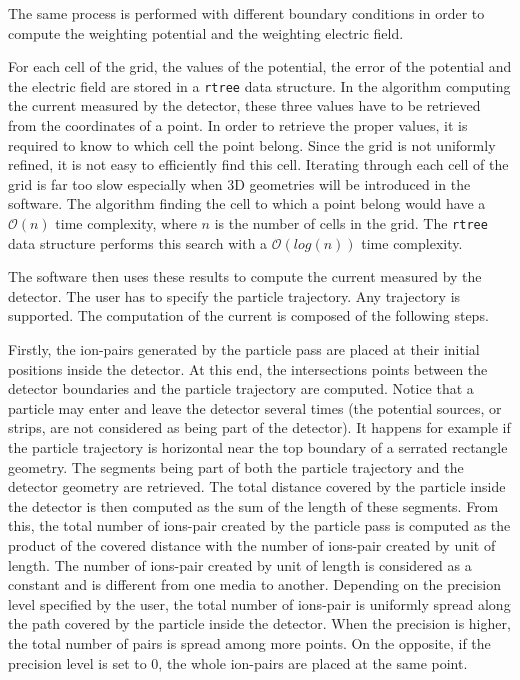 \documentclass[11pt]{article}
\begin{document}
The same process is performed with different boundary conditions in order
to compute the weighting potential and the weighting electric field.

For each cell of the grid, the values of the potential, the error of the
potential and the electric field are stored in a \texttt{rtree} data structure.
In the algorithm computing the current measured by the detector, these three
values have to be retrieved from the coordinates of a point. In order to retrieve the proper
values, it is required to know to which cell the point belong. Since the grid
is not uniformly refined, it is not easy to efficiently find this cell.
Iterating through each cell of the grid is far too slow especially when 3D
geometries will be introduced in the software. The algorithm finding the cell
to which a point belong would have a $\mathcal{O}(n)$ time complexity, where $n$
is the number of cells in the grid. The \texttt{rtree} data structure
performs this search with a $\mathcal{O}(log(n))$ time complexity.

The software then uses these results to compute the current measured by the
detector. The user has to specify the particle trajectory. Any trajectory is
supported. The computation of the current is composed of the following steps.

Firstly, the ion-pairs generated by the particle pass are placed at their initial
positions inside the detector. At this end, the intersections points between the
detector boundaries and the particle
trajectory are computed. Notice that a particle may enter and leave the detector
several times (the potential sources, or strips, are not considered as being
part of the detector). It happens for example if the particle trajectory is
horizontal near the top boundary of a serrated rectangle geometry.
The segments being part of both the particle trajectory and the detector
geometry are retrieved. The total
distance covered by the particle inside the detector is then computed as
the sum of the length of these segments. From this, the total number of ions-pair
created by the particle pass is computed
as the product of the covered distance with the number of ions-pair created by unit
of length. The number of ions-pair created by unit
of length is considered as a constant and is different from one
media to another. Depending on the precision level specified by the user, the
total number of ions-pair
is uniformly spread along the path covered by the particle inside the
detector. When the precision is higher, the total number of pairs is spread
among more points. On the opposite, if the precision level is set to 0,
the whole ion-pairs are placed at the same point.
\end{document}
